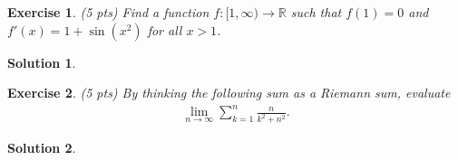 \documentclass[12pt]{article}
\newcommand{\bR}{\mathbb{R}}
\newcommand{\ra}{\rightarrow}
\theoremstyle{plain}
\newtheorem{exer}{\textbf{Exercise}}}
\theoremstyle{plain}
\newtheorem*{sol}{\textbf{Solution}}}
\begin{document}
\begin{exer}
(5 pts)
Find a function $f : [1, \infty ) \ra \bR$ such that $f(1) = 0$ and $f'(x) = 1 + \sin (x^2 )$ for all $x > 1$.
\end{exer}
\begin{sol}

\end{sol}

\begin{exer}
(5 pts)
By thinking the following sum as a Riemann sum, evaluate
	\begin{align*}
	\lim_{n \ra \infty} \sum_{k = 1}^n \frac{n}{k^2 + n^2} .
	\end{align*}
\end{exer}
\begin{sol}

\end{sol}
\end{document}
